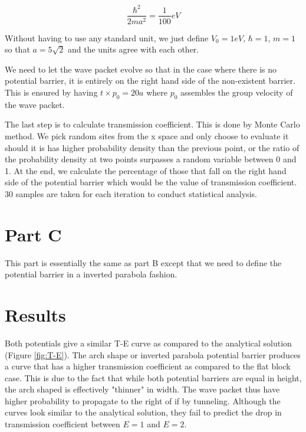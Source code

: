 \documentclass{article}
\begin{document}
$$\frac{\hbar^2}{2m a^2} = \frac{1}{100}eV$$

Without having to use any standard unit, we just define $V_0 = 1
   eV$, $\hbar = 1$, $m = 1$ so that $a = 5\sqrt{2}$
and the units agree with each other.

We need to let the wave packet evolve so that in the case where
there is no potential barrier, it is entirely on the right hand
side of the non-existent barrier. This is ensured by having $t \times p_0 =
   20a$ where $p_0$ assembles the group velocity of the wave packet.

The last step is to calculate transmission coefficient. This is
done by Monte Carlo method. We pick random sites from the x space
and only choose to evaluate it should it is has higher probability
density than the previous point, or the ratio of the probability
density at two points surpasses a random variable between 0 and 1.
At the end, we calculate the percentage of those that fall on the
right hand side of the potential barrier which would be the value
of transmission coefficient. 30 samples are taken for each
iteration to conduct statistical analysis.

\section{Part C}
\label{sec-3}

This part is essentially the same as part B except that we need to
define the potential barrier in a inverted parabola fashion.

\section{Results}
\label{sec-4}

Both potentials give a similar T-E curve as compared to the
analytical solution (Figure \ref{fig:T-E}). The arch shape or
inverted parabola potential barrier produces a curve that has a
higher transmission coefficient as compared to the flat block case.
This is due to the fact that while both potential barriers are equal
in height, the arch shaped is effectively "thinner" in width. The
wave packet thus have higher probability to propagate to the right
of if by tunneling. Although the curves look similar to the
analytical solution, they fail to predict the drop in transmission
coefficient between $E = 1$ and $E = 2$.
\end{document}
